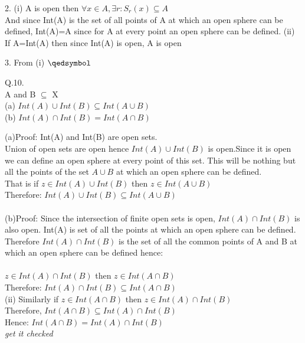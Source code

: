 \documentclass{article}
\begin{document}
2. (i) A is open then $\forall x \in A , \exists r: S_r(x) \subseteq A $\\
And since Int(A) is the set of all points of A at which an open sphere can be 
defined, Int(A)=A since for A at every point an open sphere can be defined.
(ii) If A=Int(A) then since Int(A) is open, A is open

3. From (i) 
$\qedsymbol$

\proof Q.10. \\
A and B $\subseteq$ X\\
(a) $Int(A) \cup Int(B) \subseteq Int (A \cup B)$\\
(b) $Int(A) \cap Int(B) = Int(A\cap B)$


(a)Proof: Int(A) and Int(B) are open sets.\\
Union of open sets are open hence $Int(A) \cup Int(B)$ is open.Since it is open
we can define an open sphere at every point of this set. This will be nothing 
but all the points of the set $A \cup B$ at which an open sphere can be defined.\\
That is if $z \in Int(A) \cup Int(B)$ then $z \in Int(A \cup B)$\\
Therefore: $Int(A) \cup Int(B) \subseteq Int( A \cup B)$\\\\
(b)Proof: Since the intersection of finite open sets is open, $Int(A) \cap Int(B)$ is also open. 
Int(A) is set of all the points at which an open sphere can be defined. Therefore $Int(A) \cap Int(B)$ is the set of all the common points of A and B at which an open sphere can be defined hence:\\\\
 $z \in Int(A) \cap Int(B)$ then $z \in Int(A \cap B)$\\
Therefore: $Int(A) \cap Int(B) \subseteq Int( A \cap B)$\\
(ii) Similarly if $z \in  Int( A \cap B) $ then $z \in Int(A) \cap Int(B)$\\
Therefore, $Int( A \cap B) \subseteq Int(A) \cap Int(B) $\\
Hence: $Int( A \cap B) = Int(A) \cap Int(B) $\\

\emph{get it checked}
\end{document}
